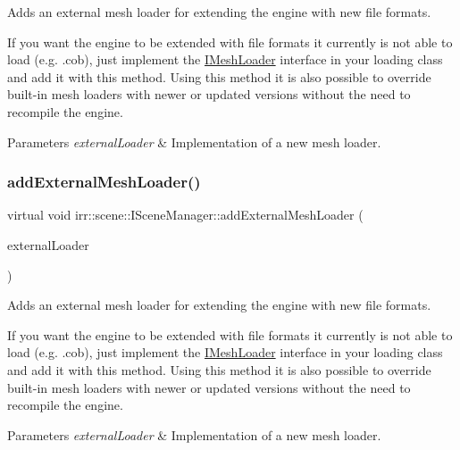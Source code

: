 Adds an external mesh loader for extending the engine with new file formats. 

If you want the engine to be extended with file formats it currently is not able to load (e.\+g. .cob), just implement the \hyperlink{classirr_1_1scene_1_1IMeshLoader}{I\+Mesh\+Loader} interface in your loading class and add it with this method. Using this method it is also possible to override built-\/in mesh loaders with newer or updated versions without the need to recompile the engine. 
\begin{DoxyParams}{Parameters}
{\em external\+Loader} & Implementation of a new mesh loader. \\
\hline
\end{DoxyParams}
\mbox{\label{classirr_1_1scene_1_1ISceneManager_a808972cc001db86c0576c38b3b3fbbf7}} 
\subsubsection{\texorpdfstring{add\+External\+Mesh\+Loader()}{addExternalMeshLoader()}\hspace{0.1cm}{\footnotesize\ttfamily [2/2]}}
{\footnotesize\ttfamily virtual void irr\+::scene\+::\+I\+Scene\+Manager\+::add\+External\+Mesh\+Loader (\begin{DoxyParamCaption}\item[{\hyperlink{classirr_1_1scene_1_1IMeshLoader}{I\+Mesh\+Loader} $\ast$}]{external\+Loader }\end{DoxyParamCaption})\hspace{0.3cm}{\ttfamily [pure virtual]}}



Adds an external mesh loader for extending the engine with new file formats. 

If you want the engine to be extended with file formats it currently is not able to load (e.\+g. .cob), just implement the \hyperlink{classirr_1_1scene_1_1IMeshLoader}{I\+Mesh\+Loader} interface in your loading class and add it with this method. Using this method it is also possible to override built-\/in mesh loaders with newer or updated versions without the need to recompile the engine. 
\begin{DoxyParams}{Parameters}
{\em external\+Loader} & Implementation of a new mesh loader. \\
\hline
\end{DoxyParams}
\mbox{\label{classirr_1_1scene_1_1ISceneManager_a8f0bc0221c4faaca80ac8f560ee424ef}} 
